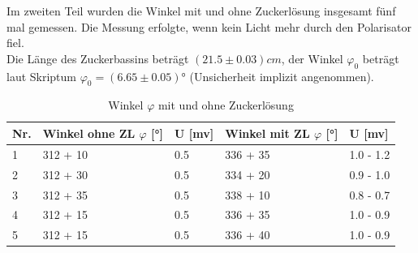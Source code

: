 \documentclass[12pt,a4paper,twoside]{article}
\begin{document}
\noindent
Im zweiten Teil wurden die Winkel mit und ohne Zuckerlösung insgesamt fünf mal gemessen. Die Messung erfolgte, wenn kein Licht mehr durch den Polarisator fiel. 
\\
Die Länge des Zuckerbassins beträgt $(21.5 \pm 0.03)cm$, der Winkel $\varphi_0$ beträgt laut Skriptum $\varphi_0 = (6.65 \pm 0.05)$° \cite{teachcenter2} (Unsicherheit implizit angenommen). 

\begin{table}[H]
    \centering
    \caption{Winkel $\varphi$ mit und ohne Zuckerlösung}
    \label{tab:Messdaten Zuckerlösung}
    \begin{tabular}{| l | l | l | l | l |}
        \hline
        Nr. & Winkel ohne ZL $\varphi$ [°] & U [mv] & Winkel mit ZL $\varphi$ [°] & U [mv] \\
        \hline
        1   & 312 + 10  & 0.5   & 336 + 35 & 1.0 - 1.2 \\
        2   & 312 + 30  & 0.5   & 334 + 20 & 0.9 - 1.0 \\
        3   & 312 + 35  & 0.5   & 338 + 10 & 0.8 - 0.7 \\
        4   & 312 + 15  & 0.5   & 336 + 35 & 1.0 - 0.9 \\
        5   & 312 + 15  & 0.5   & 336 + 40 & 1.0 - 0.9 \\
        \hline
    \end{tabular}
\end{table}
\end{document}
